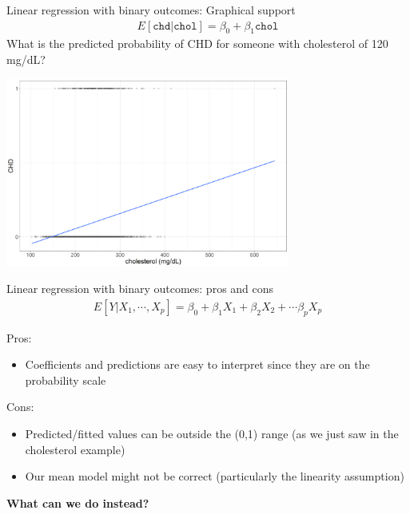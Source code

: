 \documentclass[10pt,t]{beamer}
\begin{document}
\begin{frame}{Linear regression with binary outcomes: Graphical support}
	\vspace{-1cm}
	\begin{align*} 
		E[\texttt{chd}|\texttt{chol}] = \beta_0 + \beta_1 \texttt{chol}  
	\end{align*}
	What is the predicted probability of CHD for someone with cholesterol of 120 mg/dL?
	
	\begin{center}
		\includegraphics[width=0.7\textwidth]{./figs/scatter_lm}
	\end{center}
\end{frame}

\begin{frame}{Linear regression with binary outcomes: pros and cons}
	\begin{align*} 
		E[Y|X_1,\cdots,X_p] = \beta_0 + \beta_1 X_1 + \beta_2 X_2 + \cdots \beta_p X_p 
	\end{align*}
	
	Pros: 
	\begin{itemize}
		\item Coefficients and predictions are easy to interpret since they are on the probability scale
	\end{itemize}
	
	Cons: 
	\begin{itemize}
		\item Predicted/fitted values can be outside the (0,1) range (as we just saw in the cholesterol example)
		\item Our mean model might not be correct (particularly the linearity assumption)%
	\end{itemize}
	
	\textbf{What can we do instead?}
\end{frame}
\end{document}
